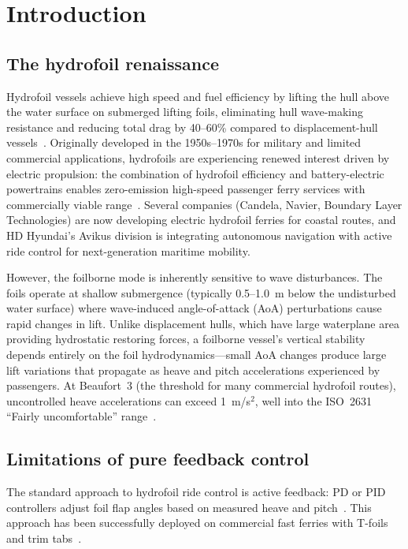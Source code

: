 \documentclass[review]{elsarticle}
\begin{document}
\section{Introduction}
\label{sec:intro}

\subsection{The hydrofoil renaissance}

Hydrofoil vessels achieve high speed and fuel efficiency by lifting
the hull above the water surface on submerged lifting
foils, eliminating hull wave-making resistance and reducing total
drag by 40--60\% compared to displacement-hull
vessels~\citep{faltinsen2005, migeotte2001}.
Originally developed in the 1950s--1970s for military and limited
commercial applications, hydrofoils are experiencing renewed interest
driven by electric propulsion: the combination of hydrofoil efficiency
and battery-electric powertrains enables zero-emission high-speed
passenger ferry services with commercially viable
range~\citep{faltinsen2005}.
Several companies (Candela, Navier, Boundary Layer Technologies)
are now developing electric hydrofoil ferries for coastal routes,
and HD Hyundai's Avikus division is integrating autonomous navigation
with active ride control for next-generation maritime mobility.

However, the foilborne mode is inherently sensitive to wave
disturbances.
The foils operate at shallow submergence (typically 0.5--1.0~m below
the undisturbed water surface) where wave-induced
angle-of-attack (AoA) perturbations cause rapid changes in lift.
Unlike displacement hulls, which have large waterplane area providing
hydrostatic restoring forces, a foilborne vessel's vertical stability
depends entirely on the foil hydrodynamics---small AoA changes produce
large lift variations that propagate as heave and pitch accelerations
experienced by passengers.
At Beaufort~3 (the threshold for many commercial hydrofoil routes),
uncontrolled heave accelerations can exceed 1~m/s$^2$, well into the
ISO~2631 ``Fairly uncomfortable'' range~\citep{iso2631, haywood1995}.

\subsection{Limitations of pure feedback control}

The standard approach to hydrofoil ride control is active feedback:
PD or PID controllers adjust foil flap angles based on measured
heave and pitch~\citep{giron2001, esteban2005}.
This approach has been successfully deployed on commercial fast
ferries with T-foils and trim tabs~\citep{haywood1995}.
\end{document}
